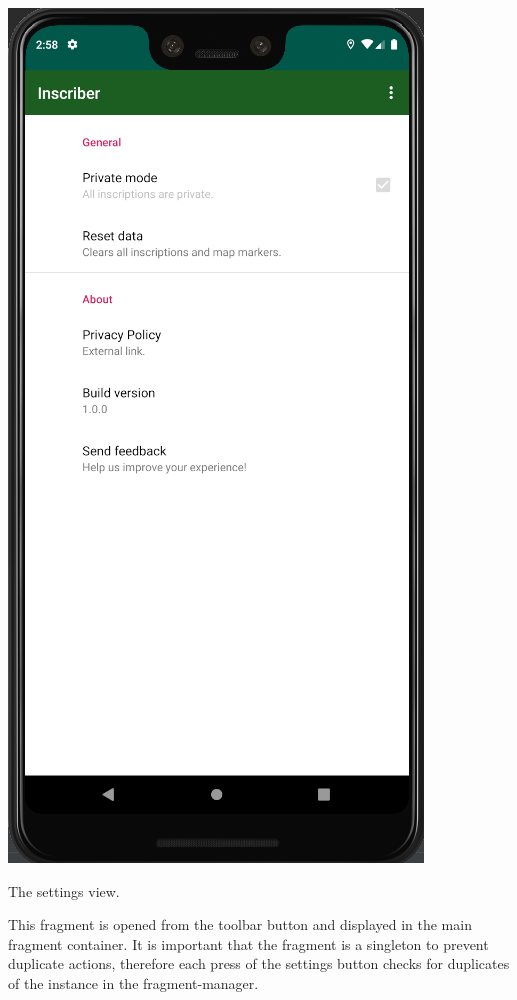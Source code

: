 \documentclass[]{article}
\begin{document}
\begin{flushleft}
\begin{floatingfigure}[r]{0.3\linewidth}
	\includegraphics[scale=0.4]{settings.png}
	\caption{The settings view.}
	\label{fig:settings}
	\vspace{\dimexpr0.3\baselineskip-\topskip}
\end{floatingfigure}
\medskip
This fragment is opened from the toolbar button and displayed in the main fragment container. It is important that the fragment is a singleton to prevent duplicate actions, therefore each press of the settings button checks for duplicates of the instance in the fragment-manager.\medskip


\end{flushleft}
\end{document}
